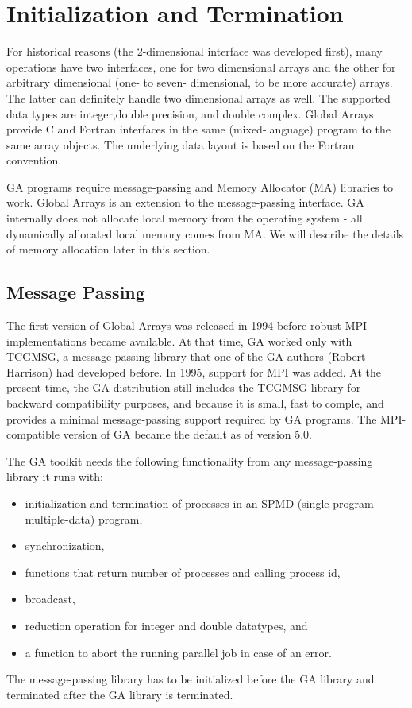 \chapter{Initialization and Termination}
\label{sec:Initialization-and-Termination}

For historical reasons (the 2-dimensional interface was developed first), many
operations have two interfaces, one for two dimensional arrays and the other
for arbitrary dimensional (one- to seven- dimensional, to be more accurate)
arrays. The latter can definitely handle two dimensional arrays as well. The
supported data types are integer,double precision, and double complex. Global
Arrays provide C and Fortran interfaces in the same (mixed-language) program to
the same array objects. The underlying data layout is based on the Fortran
convention.

GA programs require message-passing and Memory Allocator (MA) libraries to
work. Global Arrays is an extension to the message-passing interface.  GA
internally does not allocate local memory from the operating system - all
dynamically allocated local memory comes from MA. We will describe the details
of memory allocation later in this section. 

\section{Message Passing}

The first version of Global Arrays was released in 1994 before robust MPI
implementations became available. At that time, GA worked only with TCGMSG, a
message-passing library that one of the GA authors (Robert Harrison) had
developed before. In 1995, support for MPI was added. At the present time, the
GA distribution still includes the TCGMSG library for backward compatibility
purposes, and because it is small, fast to comple, and provides a minimal
message-passing support required by GA programs. The MPI-compatible version of
GA became the default as of version 5.0. 

The GA toolkit needs the following functionality from any message-passing
library it runs with:
\begin{itemize}
\item initialization and termination of processes in an SPMD
(single-program-multiple-data) program, 
\item synchronization, 
\item functions that return number of processes and calling process id, 
\item broadcast, 
\item reduction operation for integer and double datatypes, and 
\item a function to abort the running parallel job in case of an error.
\end{itemize}
The message-passing library has to be initialized before the GA library and
terminated after the GA library is terminated.

